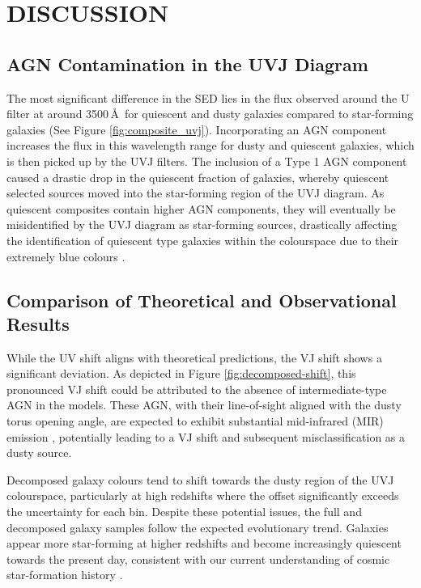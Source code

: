 \documentclass[
  journal=pasa,
  manuscript=research-paper,
  year=202X,
  volume=YY,
]{cup-journal}
\begin{document}
\section{DISCUSSION}
\label{sec:discussion}

\subsection{AGN Contamination in the UVJ Diagram}
\label{subsec:disc_contamination}

The most significant difference in the SED lies in the flux observed around the U filter at around 3500\,\AA\ for quiescent and dusty galaxies compared to star-forming galaxies (See Figure \ref{fig:composite_uvj}). Incorporating an AGN component increases the flux in this wavelength range for dusty and quiescent galaxies, which is then picked up by the UVJ filters. The inclusion of a Type 1 AGN component caused a drastic drop in the quiescent fraction of galaxies, whereby quiescent selected sources moved into the star-forming region of the UVJ diagram. As quiescent composites contain higher AGN components, they will eventually be misidentified by the UVJ diagram as star-forming sources, drastically affecting the identification of quiescent type galaxies within the colourspace due to their extremely blue colours \citep{florez_exploring_2020}.

\subsection{Comparison of Theoretical and Observational Results}
\label{subsec:disc_comparison}

While the UV shift aligns with theoretical predictions, the VJ shift shows a significant deviation. As depicted in Figure \ref{fig:decomposed-shift}, this pronounced VJ shift could be attributed to the absence of intermediate-type AGN in the models. These AGN, with their line-of-sight aligned with the dusty torus opening angle, are expected to exhibit substantial mid-infrared (MIR) emission \citep{ciesla_constraining_2015}, potentially leading to a VJ shift and subsequent misclassification as a dusty source.

Decomposed galaxy colours tend to shift towards the dusty region of the UVJ colourspace, particularly at high redshifts where the offset significantly exceeds the uncertainty for each bin. Despite these potential issues, the full and decomposed galaxy samples follow the expected evolutionary trend. Galaxies appear more star-forming at higher redshifts and become increasingly quiescent towards the present day, consistent with our current understanding of cosmic star-formation history \citep{madau_cosmic_2014, kim_cosmic_2024}.
\end{document}
